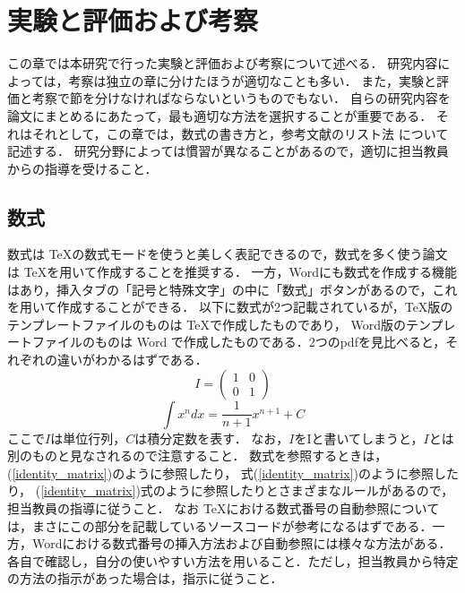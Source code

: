\chapter{実験と評価および考察}	%

この章では本研究で行った実験と評価および考察について述べる．
研究内容によっては，考察は独立の章に分けたほうが適切なことも多い．
また，実験と評価と考察で節を分けなければならないというものでもない．
自らの研究内容を論文にまとめるにあたって，最も適切な方法を選択することが重要である．
それはそれとして，この章では，数式の書き方と，参考文献のリスト法
について記述する．
研究分野によっては慣習が異なることがあるので，適切に担当教員からの指導を受けること．

\section{数式}
数式は \TeX の数式モードを使うと美しく表記できるので，数式を多く使う論文は \TeX を用いて作成することを推奨する．
一方，Wordにも数式を作成する機能はあり，挿入タブの「記号と特殊文字」の中に「数式」ボタンがあるので，これを用いて作成することができる．
以下に数式が2つ記載されているが，\TeX 版のテンプレートファイルのものは \TeX で作成したものであり，
Word版のテンプレートファイルのものは Word で作成したものである．2つのpdfを見比べると，それぞれの違いがわかるはずである．
\begin{equation} \label{identity_matrix}
I=\begin{pmatrix} 1 & 0 \\ 0 & 1 \end{pmatrix}
\end{equation}
\begin{equation} \label{integral}
\int x^n dx =\frac{1}{n+1} x^{n+1} +C 
\end{equation}
ここで$I$は単位行列，$C$は積分定数を表す．
なお，$I$をIと書いてしまうと，$I$とは別のものと見なされるので注意すること．
数式を参照するときは，(\ref{identity_matrix})のように参照したり，
式(\ref{identity_matrix})のように参照したり，
(\ref{identity_matrix})式のように参照したりとさまざまなルールがあるので，
担当教員の指導に従うこと．
なお \TeX における数式番号の自動参照については，まさにこの部分を記載しているソースコードが参考になるはずである．一方，Wordにおける数式番号の挿入方法および自動参照には様々な方法がある．各自で確認し，自分の使いやすい方法を用いること．ただし，担当教員から特定の方法の指示があった場合は，指示に従うこと．

